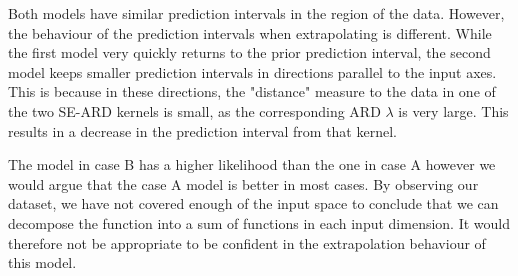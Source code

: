 \documentclass[11pt]{article}
\begin{document}
Both models have similar prediction intervals in the region of the data. However, the behaviour of the prediction intervals when extrapolating is different. While the first model very quickly returns to the prior prediction interval, the second model keeps smaller prediction intervals in directions parallel to the input axes. This is because in these directions, the "distance" measure to the data in one of the two SE-ARD kernels is small, as the corresponding ARD $\lambda$ is very large. This results in a decrease in the prediction interval from that kernel. 

The model in case B has a higher likelihood than the one in case A however we would argue that the case A model is better in most cases. By observing our dataset, we have not covered enough of the input space to conclude that we can decompose the function into a sum of functions in each input dimension. It would therefore not be appropriate to be confident in the extrapolation behaviour of this model.
\end{document}

